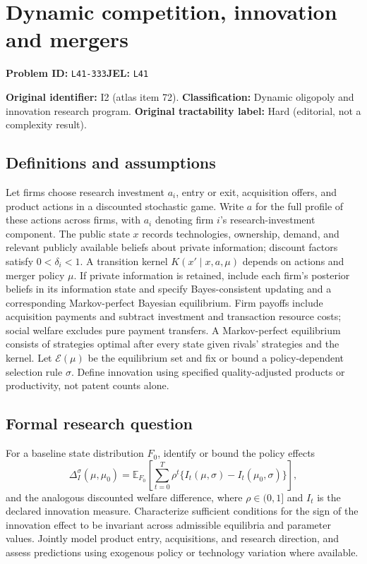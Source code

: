 \documentclass[11pt,a4paper]{article}
\begin{document}
\section*{Dynamic competition, innovation and mergers}
\textbf{Problem ID:} \texttt{L41-333}\quad \textbf{JEL:} \texttt{L41}\par
\label{problem:OP-0072}
\label{atlas:prob:I2}

\noindent\textbf{Original identifier:} I2 (atlas item 72). \textbf{Classification:} Dynamic oligopoly and innovation research program. \textbf{Original tractability label:} Hard (editorial, not a complexity result).

\subsection*{Definitions and assumptions}

Let firms choose research investment $a_i$, entry or exit, acquisition offers, and product actions in a discounted stochastic game. Write $a$ for the full profile of these actions across firms, with $a_i$ denoting firm $i$'s research-investment component. The public state $x$ records technologies, ownership, demand, and relevant publicly available beliefs about private information; discount factors satisfy $0<\delta_i<1$. A transition kernel $K(x'\mid x,a,\mu)$ depends on actions and merger policy $\mu$. If private information is retained, include each firm's posterior beliefs in its information state and specify Bayes-consistent updating and a corresponding Markov-perfect Bayesian equilibrium. Firm payoffs include acquisition payments and subtract investment and transaction resource costs; social welfare excludes pure payment transfers. A Markov-perfect equilibrium consists of strategies optimal after every state given rivals' strategies and the kernel. Let $\mathcal E(\mu)$ be the equilibrium set and fix or bound a policy-dependent selection rule $\sigma$. Define innovation using specified quality-adjusted products or productivity, not patent counts alone.

\subsection*{Formal research question}

For a baseline state distribution $F_0$, identify or bound the policy effects
\[
\Delta_I^{\sigma}(\mu,\mu_0)=\mathbb E_{F_0}\!\left[\sum_{t=0}^{T}\rho^t\{I_t(\mu,\sigma)-I_t(\mu_0,\sigma)\}\right],
\]
and the analogous discounted welfare difference, where $\rho\in(0,1]$ and $I_t$ is the declared innovation measure. Characterize sufficient conditions for the sign of the innovation effect to be invariant across admissible equilibria and parameter values. Jointly model product entry, acquisitions, and research direction, and assess predictions using exogenous policy or technology variation where available.
\end{document}
